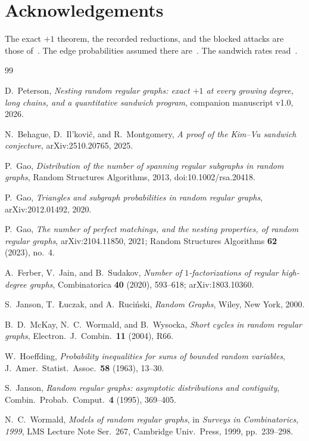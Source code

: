 \documentclass[11pt]{article}
\begin{document}
\section*{Acknowledgements}
The exact \(+1\) theorem, the recorded reductions, and the blocked attacks
are those of~\cite{PlusOneV1}.
The edge probabilities assumed there are~\cite[Theorem~6]{Gao20}.
The sandwich rates read~\cite{BIM25}.

\begin{thebibliography}{99}

D.~Peterson,
\emph{Nesting random regular graphs: exact \(+1\) at every growing degree, long chains, and a quantitative sandwich program},
companion manuscript v1.0, 2026.

N.~Behague, D.~Il'kovi\v{c}, and R.~Montgomery,
\emph{A proof of the Kim--Vu sandwich conjecture},
arXiv:2510.20765, 2025.

P.~Gao,
\emph{Distribution of the number of spanning regular subgraphs in random graphs},
Random Structures Algorithms, 2013, doi:10.1002/rsa.20418.

P.~Gao,
\emph{Triangles and subgraph probabilities in random regular graphs},
arXiv:2012.01492, 2020.

P.~Gao,
\emph{The number of perfect matchings, and the nesting properties, of random regular graphs},
arXiv:2104.11850, 2021;
Random Structures Algorithms \textbf{62} (2023), no.~4.

A.~Ferber, V.~Jain, and B.~Sudakov,
\emph{Number of \(1\)-factorizations of regular high-degree graphs},
Combinatorica \textbf{40} (2020), 593--618;
arXiv:1803.10360.

S.~Janson, T.~\L uczak, and A.~Ruci\'nski,
\emph{Random Graphs},
Wiley, New York, 2000.

B.~D.~McKay, N.~C.~Wormald, and B.~Wysocka,
\emph{Short cycles in random regular graphs},
Electron.\ J.\ Combin.\ \textbf{11} (2004), R66.

W.~Hoeffding,
\emph{Probability inequalities for sums of bounded random variables},
J.\ Amer.\ Statist.\ Assoc.\ \textbf{58} (1963), 13--30.

S.~Janson,
\emph{Random regular graphs: asymptotic distributions and contiguity},
Combin.\ Probab.\ Comput.\ \textbf{4} (1995), 369--405.

N.~C.~Wormald,
\emph{Models of random regular graphs},
in \emph{Surveys in Combinatorics, 1999},
LMS Lecture Note Ser.\ 267, Cambridge Univ.\ Press, 1999, pp.~239--298.


\end{thebibliography}
\end{document}
